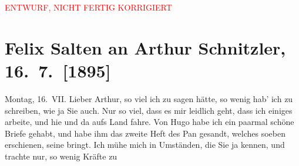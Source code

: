
\begin{center}
            \textcolor{red}{ENTWURF, NICHT FERTIG KORRIGIERT}
                      \end{center}
            
         
         \renewcommand{\erwaehntePersonen}{Personen: Richard Beer-Hofmann, Hugo von Hofmannsthal, Charlotte Pohl-Glas}
         \renewcommand{\erwaehnteOrte}{Orte: Bad Ischl, Kopenhagen, Wien}
         \renewcommand{\erwaehnteWerke}{Werke: Pan, Quer durch den Wurstelprater, Terzinen}
               \section[Felix Salten an Arthur Schnitzler, 16. 7. {[}1895{]}]{ Felix Salten an Arthur Schnitzler, 16. 7. {[}1895{]}}\nopagebreak{}\rehead{ }\begin{ledgroupsized}[t]{13cm}\normalsize\beginnumbering \toendnotes[C]{\smallbreak\pagebreak[2]} 
\toendnotes[C]{\smallbreak}\pstart
           \raggedleft{}{\pb}Montag, 16. VII.\pend
           \pstart
           Lieber Arthur, so viel ich zu sagen hätte, so wenig hab' ich zu
               schreiben, wie ja Sie auch. Nur so viel, dass es mir leidlich geht, dass ich einiges
               arbeite, und hie und da aufs Land fahre. Von Hugo habe ich ein paarmal schöne Briefe gehabt, und habe ihm das zweite Heft
               des Pan gesandt, welches soeben {\pb}erschienen, seine \label{K_L03158-1v}\label{K_L03158-1h} bringt. Ich
               mühe mich in Umständen, die Sie ja kennen, und trachte nur, so wenig Kräfte zu

\end{ledgroupsized}
